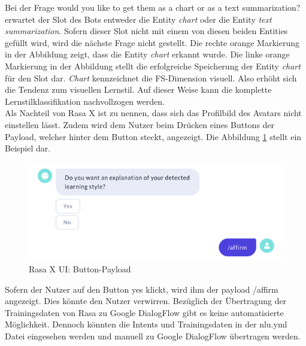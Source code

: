 Bei der Frage \glqq would you like to get them as a chart or as a text summarization?\grqq{}
erwartet der Slot des Bots entweder die Entity \textit{chart} oder die Entity \textit{text summarization}. Sofern dieser Slot nicht mit einem von diesen beiden 
Entities gefüllt wird, wird die nächste Frage nicht gestellt. Die rechte orange Markierung in der Abbildung zeigt, dass die Entity \textit{chart}
erkannt wurde. Die linke orange Markierung in der Abbildung stellt die erfolgreiche Speicherung der Entity \textit{chart} für den Slot dar.
\textit{Chart} kennzeichnet die FS-Dimension visuell. Also erhöht sich die Tendenz zum visuellen Lernstil. Auf dieser Weise kann die 
komplette Lernstilklassifikation nachvollzogen werden. \\
Als Nachteil von Rasa X ist zu nennen, dass sich das Profilbild des Avatars nicht einstellen lässt. Zudem wird dem Nutzer 
beim Drücken eines Buttons der Payload, welcher hinter dem Button steckt, angezeigt. Die Abbildung \ref{fig:ButtonID} stellt ein Beispiel dar.
\begin{figure}[H]
    \centering
    \includegraphics[width=0.6\linewidth]{images//buttonID.png}
   \caption[Rasa X UI: Button-Payload] {Rasa X UI: Button-Payload}
  \label{fig:ButtonID}
  \end{figure} 

Sofern der Nutzer auf den Button 
\glqq yes\grqq{} klickt, wird ihm der payload \glqq /affirm\grqq{} angezeigt. Dies könnte den Nutzer verwirren.
Bezüglich der Übertragung der Trainingsdaten von Rasa zu Google DialogFlow gibt es keine automatisierte Möglichkeit.
Dennoch könnten die Intents und Trainingsdaten in der nlu.yml Datei eingesehen werden und manuell zu Google DialogFlow übertragen werden.

